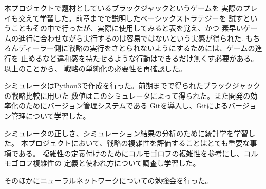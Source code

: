 本プロジェクトで題材としているブラックジャックというゲームを
実際のプレイも交えて学習した。前章までで説明したベーシックストラテジーを
試すということもその中で行ったが、実際に使用してみると表を覚え、かつ
素早いゲームの進行に合わせながら実行するのは容易ではないという実感が得られた.
もちろんディーラー側に戦略の実行をさとられないようにするためには、ゲームの進行を
止めるなど違和感を持たせるような行動はできるだけ無くす必要がある。以上のことから、
戦略の単純化の必要性を再確認した。

シミュレータはPython3で作成を行った。前期までで得られたブラックジャックの戦略比較に用いた
数値はこのシミュレータによって得られた。また開発の効率化のためにバージョン管理システムである
Gitを導入し、Gitによるバージョン管理について学習した。

シミュレータの正しさ、シミュレーション結果の分析のために統計学を学習した。
本プロジェクトにおいて、戦略の複雑性を評価することはとても重要な事項である。
複雑性の定義付けのためにコルモゴロフの複雑性を参考にし、コルモゴロフ複雑性の
定義と使われ方について調査し学習した。

そのほかにニューラルネットワークについての勉強会を行った。

